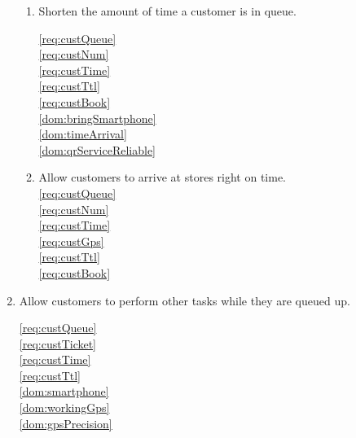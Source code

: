 \begin{enumerate}[label=\textbf{G.\arabic*}]
\begin{enumerate}[label*=\textbf{.\arabic*}, leftmargin=+.5in]
            \item Shorten the amount of time a customer is in queue.

            \ref{req:custQueue}  ~\\
            \ref{req:custNum}  ~\\
            \ref{req:custTime}  ~\\
            \ref{req:custTtl}  ~\\
            \ref{req:custBook}  ~\\

            \ref{dom:bringSmartphone}  ~\\
            \ref{dom:timeArrival}  ~\\
            \ref{dom:qrServiceReliable}  ~\\


            \item Allow customers to arrive at stores right on time. ~\\
            \ref{req:custQueue}  ~\\
            \ref{req:custNum}  ~\\
            \ref{req:custTime}  ~\\
            \ref{req:custGps}  ~\\
            \ref{req:custTtl}  ~\\
            \ref{req:custBook}  ~\\

        \end{enumerate}

        \item Allow customers to perform other tasks while they are queued up.

        \ref{req:custQueue}  ~\\
        \ref{req:custTicket}  ~\\
        \ref{req:custTime}  ~\\
        \ref{req:custTtl}  ~\\

        \ref{dom:smartphone}  ~\\
        \ref{dom:workingGps}  ~\\
        \ref{dom:gpsPrecision}  ~\\



\end{enumerate}
